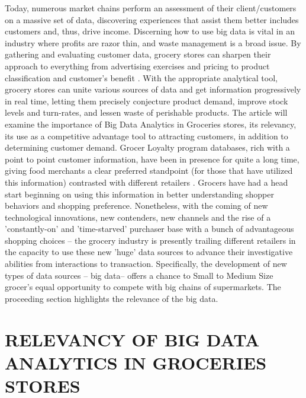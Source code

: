 \documentclass[sigconf]{acmart}
\begin{document}
Today, numerous market chains perform an assessment of their client/customers on a massive set of data, discovering experiences that assist them better includes customers and, thus, drive income. Discerning how to use big data is vital in an industry where profits are razor thin, and waste management is a broad issue. By gathering and evaluating customer data, grocery stores can sharpen their approach to everything from advertising exercises and pricing to product classification and customer’s benefit \cite{2,4}. With the appropriate analytical tool, grocery stores can unite various sources of data and get information progressively in real time, letting them precisely conjecture product demand, improve stock levels and turn-rates, and lessen waste of perishable products. The article will examine the importance of Big Data Analytics in Groceries stores, its relevancy, its use as a competitive advantage tool to attracting customers, in addition to determining customer demand.  Grocer Loyalty program databases, rich with a point to point customer information, have been in presence for quite a long time, giving food merchants a clear preferred standpoint (for those that have utilized this information) contrasted with different retailers \cite{1}. Grocers have had a head start beginning on using this information in better understanding shopper behaviors and shopping preference. Nonetheless, with the coming of new technological innovations, new contenders, new channels and the rise of a 'constantly-on' and 'time-starved' purchaser base with a bunch of advantageous shopping choices – the grocery industry is presently trailing different retailers in the capacity to use these new 'huge' data sources to advance their investigative abilities from interactions to transaction\cite{5}. Specifically, the development of new types of data sources – big data– offers a chance to Small to Medium Size grocer's equal opportunity to compete with big chains of supermarkets. The proceeding section highlights the relevance of the big data.   

\section{RELEVANCY OF BIG DATA ANALYTICS IN GROCERIES STORES}
\end{document}
